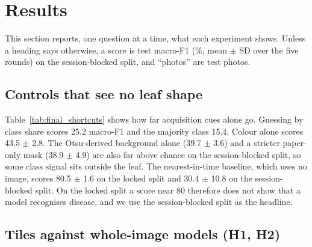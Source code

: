 \section{Results}
\label{sec:results}

This section reports, one question at a time, what each experiment shows. Unless a heading says otherwise, a score is
test macro-F1 (\%, mean $\pm$ SD over the five rounds) on the session-blocked split, and ``photos'' are test photos.

\subsection{Controls that see no leaf shape}
\label{sec:res:controls}

Table~\ref{tab:final_shortcuts} shows how far acquisition cues alone go. Guessing by class share scores 25.2 macro-F1 and
the majority class 15.4. Colour alone scores 43.5 $\pm$ 2.8. The Otsu-derived background alone (39.7 $\pm$ 3.6) and a stricter paper-only mask
(38.9 $\pm$ 4.9) are also far above chance on the session-blocked split, so some class signal sits outside the leaf.
The nearest-in-time baseline, which uses no image, scores 80.5 $\pm$ 1.6 on the locked split and
30.4 $\pm$ 10.8 on the session-blocked split. On the locked split a score near 80 therefore does not show that a
model recognises disease, and we use the session-blocked split as the headline.

\subsection{Tiles against whole-image models (H1, H2)}
\label{sec:res:main}

